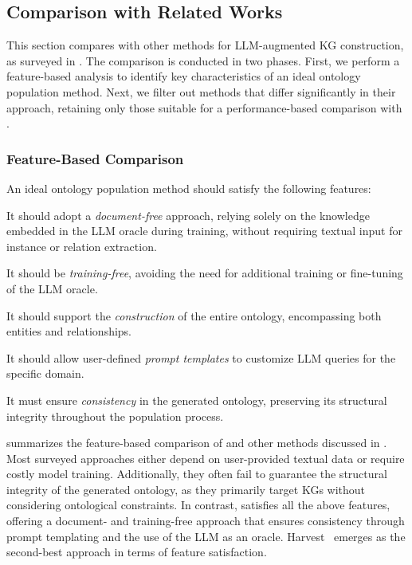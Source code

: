 \subsection{Comparison with Related Works}
\label{subsec:comparison}
%
This section compares \llmfkg{} with other methods for \gls{LLM}-augmented \gls{KG} construction, as surveyed in .
%
The comparison is conducted in two phases.
%
First, we perform a feature-based analysis to identify key characteristics of an ideal ontology population method.
%
Next, we filter out methods that differ significantly in their approach, retaining only those suitable for a performance-based comparison with \llmfkg{}.


\subsubsection{Feature-Based Comparison}
\label{subsubsec:comparison-features}
%

%
An ideal ontology population method should satisfy the following features:
%
\begin{featurelist}
    \item\label{itm:f1} It should adopt a \emph{document-free} approach, relying solely on the knowledge embedded in the \gls{LLM} oracle during training, without requiring textual input for instance or relation extraction.
    \item\label{itm:f2} It should be \emph{training-free}, avoiding the need for additional training or fine-tuning of the \gls{LLM} oracle.
    \item\label{itm:f3} It should support the \emph{construction} of the entire ontology, encompassing both entities and relationships.
    \item\label{itm:f4} It should allow user-defined \emph{prompt templates} to customize \gls{LLM} queries for the specific domain.
    \item\label{itm:f5} It must ensure \emph{consistency} in the generated ontology, preserving its structural integrity throughout the population process.
\end{featurelist}
%
 summarizes the feature-based comparison of \llmfkg{} and other methods discussed in .
%
Most surveyed approaches either depend on user-provided textual data or require costly model training.
%
Additionally, they often fail to guarantee the structural integrity of the generated ontology, as they primarily target \glspl{KG} without considering ontological constraints.
%
In contrast, \llmfkg{} satisfies all the above features, offering a document- and training-free approach that ensures consistency through prompt templating and the use of the \gls{LLM} as an oracle.
%
Harvest~\cite{HaoTTNSZXH23} emerges as the second-best approach in terms of feature satisfaction.

